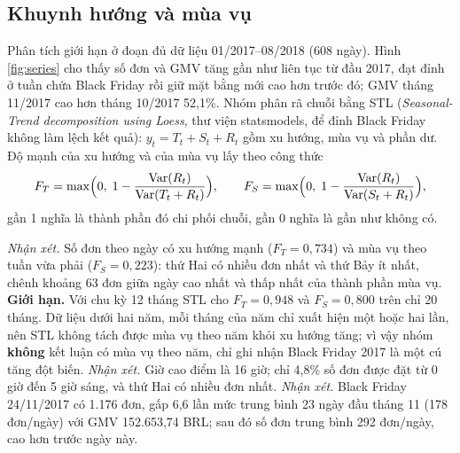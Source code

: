\subsection{Khuynh hướng và mùa vụ}\label{sec:mua-vu}
Phân tích giới hạn ở đoạn đủ dữ liệu 01/2017--08/2018 (608 ngày). Hình \ref{fig:series} cho thấy số đơn và GMV tăng gần như liên tục từ đầu 2017, đạt đỉnh ở tuần chứa Black Friday rồi giữ mặt bằng mới cao hơn trước đó; GMV tháng 11/2017 cao hơn tháng 10/2017 52,1\%.
Nhóm phân rã chuỗi bằng STL (\emph{Seasonal-Trend decomposition using Loess}, thư viện statsmodels,  để đỉnh Black Friday không làm lệch kết quả): $y_t = T_t + S_t + R_t$ gồm xu hướng, mùa vụ và phần dư. Độ mạnh của xu hướng và của mùa vụ lấy theo công thức
\[ F_T = \max\Bigl(0,\; 1 - \frac{\mathrm{Var}(R_t)}{\mathrm{Var}(T_t + R_t)}\Bigr), \qquad F_S = \max\Bigl(0,\; 1 - \frac{\mathrm{Var}(R_t)}{\mathrm{Var}(S_t + R_t)}\Bigr), \]
gần 1 nghĩa là thành phần đó chi phối chuỗi, gần 0 nghĩa là gần như không có.

\emph{Nhận xét.} Số đơn theo ngày có xu hướng mạnh ($F_T = 0{,}734$) và mùa vụ theo tuần vừa phải ($F_S = 0{,}223$): thứ Hai có nhiều đơn nhất và thứ Bảy ít nhất, chênh khoảng 63 đơn giữa ngày cao nhất và thấp nhất của thành phần mùa vụ.
\textbf{Giới hạn.} Với chu kỳ 12 tháng STL cho $F_T = 0{,}948$ và $F_S = 0{,}800$ trên chỉ 20 tháng. Dữ liệu dưới hai năm, mỗi tháng của năm chỉ xuất hiện một hoặc hai lần, nên STL không tách được mùa vụ theo năm khỏi xu hướng tăng; vì vậy nhóm \textbf{không} kết luận có mùa vụ theo năm, chỉ ghi nhận Black Friday 2017 là một cú tăng đột biến.
\emph{Nhận xét.} Giờ cao điểm là 16 giờ; chỉ 4,8\% số đơn được đặt từ 0 giờ đến 5 giờ sáng, và thứ Hai có nhiều đơn nhất.
\emph{Nhận xét.} Black Friday 24/11/2017 có 1.176 đơn, gấp 6,6 lần mức trung bình 23 ngày đầu tháng 11 (178 đơn/ngày) với GMV 152.653,74 BRL; sau đó số đơn trung bình 292 đơn/ngày, cao hơn trước ngày này.

